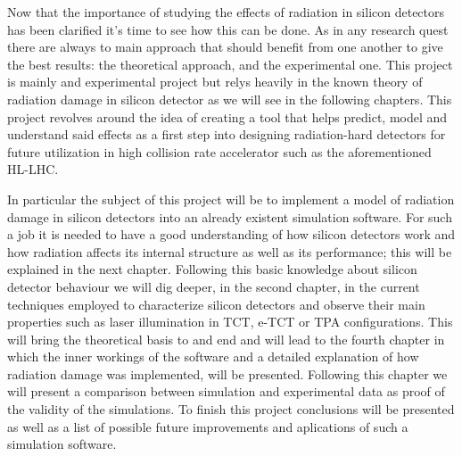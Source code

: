 Now that the importance of studying the effects of radiation in silicon detectors has been clarified it's time to see how this can be done. As in any research quest there are always to main approach that should benefit from one another to give the best results: the theoretical approach, and the experimental one. This project is mainly and experimental project but relys heavily in the known theory of radiation damage in silicon detector as we will see in the following chapters. This project revolves around the idea of creating a tool that helps predict, model and understand said effects as a first step into designing radiation-hard detectors for future utilization in high collision rate accelerator such as the aforementioned HL-LHC.

In particular the subject of this project will be to implement a model of radiation damage in silicon detectors into an already existent simulation software. For such a job it is needed to have a good understanding of how silicon detectors work and how radiation affects its internal structure as well as its performance; this will be explained in the next chapter. Following this basic knowledge about silicon detector behaviour we will dig deeper, in the second chapter, in the current techniques employed to characterize silicon detectors and observe their main properties such as laser illumination in TCT, e-TCT or TPA configurations. This will bring the theoretical basis to and end and will lead to the fourth chapter in which the inner workings of the software and a detailed explanation of how radiation damage was implemented, will be presented. Following this chapter we will present a comparison between simulation and experimental data as proof of the validity of the simulations. To finish this project conclusions will be presented as well as a list of possible future improvements and aplications of such a simulation software.

